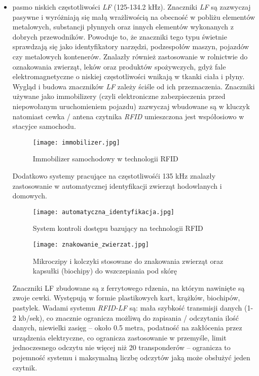 \begin{itemize}\setlength{\itemsep}{0pt}
	\item pasmo niskich częstotliwości \emph {LF} (125-134.2 kHz).
Znaczniki \emph{LF} są zazwyczaj pasywne i wyróżniają się małą wrażliwością na obecność w pobliżu elementów metalowych, substancji płynnych oraz innych elementów wykonanych z dobrych przewodników. Powoduje to, że znaczniki tego typu świetnie sprawdzają się jako identyfikatory narzędzi, podzespołów maszyn, pojazdów czy metalowych kontenerów. Znalazły również zastosowanie w rolnictwie do oznakowania zwierząt, leków oraz produktów spożywczych, gdyż fale elektromagnetyczne o niskiej częstotliwości wnikają w tkanki ciała i płyny.
Wygląd i budowa znaczników \emph{LF} zależy ściśle od ich przeznaczenia. Znaczniki używane jako immobilizery (czyli elektroniczne zabezpieczenia przed niepowołanym uruchomieniem pojazdu) zazwyczaj wbudowane są w kluczyk natomiast cewka /  antena czytnika \emph{RFID} umieszczona jest współosiowo w stacyjce samochodu.
   
	\begin{figure}[h!]
	\centering
	    \texttt{[image: immobilizer.jpg]}
	    \caption{Immobilizer samochodowy w technologii RFID}
	\end{figure}

	Dodatkowo systemy pracujące na częstotliwośći 135 kHz znalazły zastosowanie w automatycznej identyfikacji zwierząt hodowlanych i domowych.

	\begin{figure}[h!]
	\centering
	    \texttt{[image: automatyczna\_identyfikacja.jpg]}
	    \caption{System kontroli dostępu bazujący na technologii RFID}
	\end{figure}
	
	\begin{figure}[h!]
	\centering
	    \texttt{[image: znakowanie\_zwierzat.jpg]}
	    \caption{Mikroczipy i kolczyki stosowane do znakowania zwierząt oraz kapsułki (biochipy) do wszczepiania pod skórę}
	\end{figure}
	
	Znaczniki LF zbudowane są z ferrytowego rdzenia, na którym nawinięte są zwoje cewki. Występują w formie plastikowych kart, krążków, biochipów, pastylek. Wadami systemu \emph{RFID-LF} są: mała szybkość transmisji danych (1-2 kb/sek), co znacznie ogranicza możliwą do zapisania / odczytania ilość danych, niewielki zasięg – około 0.5 metra, podatność na zakłócenia przez urządzenia elektryczne, co ogranicza zastosowanie w przemyśle, limit jednoczesnego odczytu nie więcej niż 20 transponderów – ogranicza to pojemność systemu i maksymalną liczbę odczytów jaką może obsłużyć jeden czytnik. 


\end{itemize}

